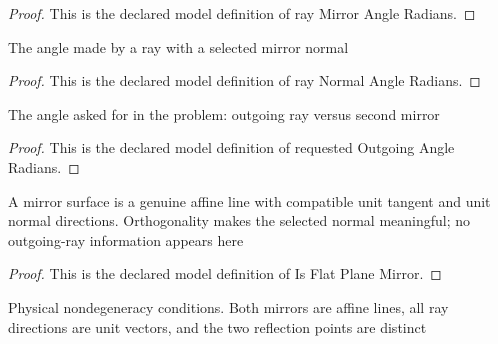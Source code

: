\begin{proof}
  This is the declared model definition of ray Mirror Angle Radians.
\end{proof}
\begin{definition}
  \label{def:physics:phyx-mini-0142:phyxminiproblems-problemphyxmini0142-raynormalangleradians}
  The angle made by a ray with a selected mirror normal
\end{definition}
\begin{proof}
  This is the declared model definition of ray Normal Angle Radians.
\end{proof}
\begin{definition}
  \label{def:physics:phyx-mini-0142:phyxminiproblems-problemphyxmini0142-requestedoutgoingangleradians}
  The angle asked for in the problem: outgoing ray versus second mirror
\end{definition}
\begin{proof}
  This is the declared model definition of requested Outgoing Angle Radians.
\end{proof}
\begin{definition}
  \label{def:physics:phyx-mini-0142:phyxminiproblems-problemphyxmini0142-isflatplanemirror}
  A mirror surface is a genuine affine line with compatible unit tangent and unit normal directions. Orthogonality makes the selected normal meaningful; no outgoing-ray information appears here
\end{definition}
\begin{proof}
  This is the declared model definition of Is Flat Plane Mirror.
\end{proof}
\begin{definition}
  \label{def:physics:phyx-mini-0142:phyxminiproblems-problemphyxmini0142-hasphysicalgeometry}
  Physical nondegeneracy conditions. Both mirrors are affine lines, all ray directions are unit vectors, and the two reflection points are distinct
\end{definition}
